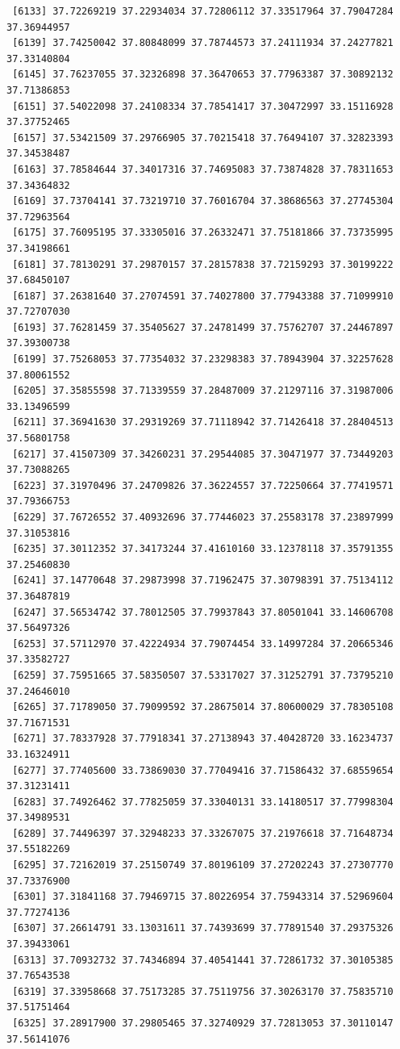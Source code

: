 \documentclass[
  letterpaper,
  DIV=11,
  numbers=noendperiod]{scrartcl}
\begin{document}
\begin{verbatim}
 [6133] 37.72269219 37.22934034 37.72806112 37.33517964 37.79047284 37.36944957
 [6139] 37.74250042 37.80848099 37.78744573 37.24111934 37.24277821 37.33140804
 [6145] 37.76237055 37.32326898 37.36470653 37.77963387 37.30892132 37.71386853
 [6151] 37.54022098 37.24108334 37.78541417 37.30472997 33.15116928 37.37752465
 [6157] 37.53421509 37.29766905 37.70215418 37.76494107 37.32823393 37.34538487
 [6163] 37.78584644 37.34017316 37.74695083 37.73874828 37.78311653 37.34364832
 [6169] 37.73704141 37.73219710 37.76016704 37.38686563 37.27745304 37.72963564
 [6175] 37.76095195 37.33305016 37.26332471 37.75181866 37.73735995 37.34198661
 [6181] 37.78130291 37.29870157 37.28157838 37.72159293 37.30199222 37.68450107
 [6187] 37.26381640 37.27074591 37.74027800 37.77943388 37.71099910 37.72707030
 [6193] 37.76281459 37.35405627 37.24781499 37.75762707 37.24467897 37.39300738
 [6199] 37.75268053 37.77354032 37.23298383 37.78943904 37.32257628 37.80061552
 [6205] 37.35855598 37.71339559 37.28487009 37.21297116 37.31987006 33.13496599
 [6211] 37.36941630 37.29319269 37.71118942 37.71426418 37.28404513 37.56801758
 [6217] 37.41507309 37.34260231 37.29544085 37.30471977 37.73449203 37.73088265
 [6223] 37.31970496 37.24709826 37.36224557 37.72250664 37.77419571 37.79366753
 [6229] 37.76726552 37.40932696 37.77446023 37.25583178 37.23897999 37.31053816
 [6235] 37.30112352 37.34173244 37.41610160 33.12378118 37.35791355 37.25460830
 [6241] 37.14770648 37.29873998 37.71962475 37.30798391 37.75134112 37.36487819
 [6247] 37.56534742 37.78012505 37.79937843 37.80501041 33.14606708 37.56497326
 [6253] 37.57112970 37.42224934 37.79074454 33.14997284 37.20665346 37.33582727
 [6259] 37.75951665 37.58350507 37.53317027 37.31252791 37.73795210 37.24646010
 [6265] 37.71789050 37.79099592 37.28675014 37.80600029 37.78305108 37.71671531
 [6271] 37.78337928 37.77918341 37.27138943 37.40428720 33.16234737 33.16324911
 [6277] 37.77405600 33.73869030 37.77049416 37.71586432 37.68559654 37.31231411
 [6283] 37.74926462 37.77825059 37.33040131 33.14180517 37.77998304 37.34989531
 [6289] 37.74496397 37.32948233 37.33267075 37.21976618 37.71648734 37.55182269
 [6295] 37.72162019 37.25150749 37.80196109 37.27202243 37.27307770 37.73376900
 [6301] 37.31841168 37.79469715 37.80226954 37.75943314 37.52969604 37.77274136
 [6307] 37.26614791 33.13031611 37.74393699 37.77891540 37.29375326 37.39433061
 [6313] 37.70932732 37.74346894 37.40541441 37.72861732 37.30105385 37.76543538
 [6319] 37.33958668 37.75173285 37.75119756 37.30263170 37.75835710 37.51751464
 [6325] 37.28917900 37.29805465 37.32740929 37.72813053 37.30110147 37.56141076

\end{verbatim}
\end{document}
